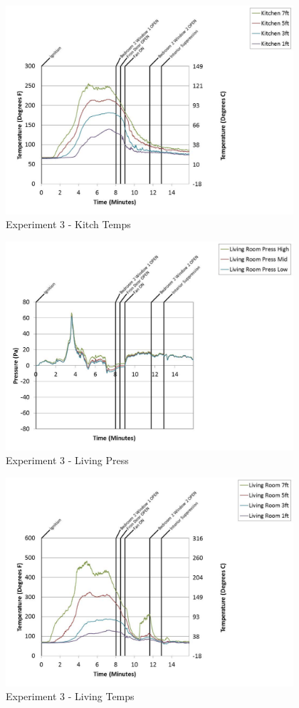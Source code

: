 \documentclass{article}
\begin{document}
\begin{appendices}
	\clearpage

	\begin{figure}[h!]
		\centering
		\includegraphics[height=3.05in]{0_Images/Results_Charts/Exp_3_Charts/KitchTemps.pdf}
		\caption{Experiment 3 - Kitch Temps}
	\end{figure}
 

	\begin{figure}[h!]
		\centering
		\includegraphics[height=3.05in]{0_Images/Results_Charts/Exp_3_Charts/LivingPress.pdf}
		\caption{Experiment 3 - Living Press}
	\end{figure}
 
	\clearpage

	\begin{figure}[h!]
		\centering
		\includegraphics[height=3.05in]{0_Images/Results_Charts/Exp_3_Charts/LivingTemps.pdf}
		\caption{Experiment 3 - Living Temps}
	\end{figure}
 


\end{appendices}
\end{document}
